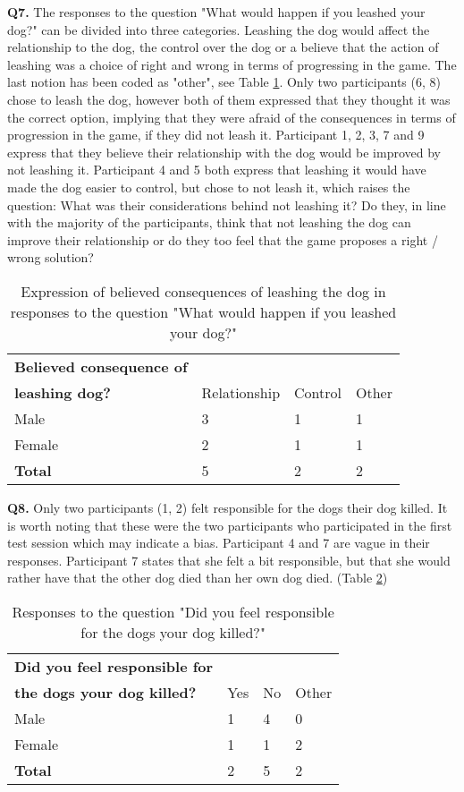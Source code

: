 \textbf{Q7.} The responses to the question "What would happen if you leashed your dog?" can be divided into three categories. Leashing the dog would affect the relationship to the dog, the control over the dog or a believe that the action of leashing was a choice of right and wrong in terms of progressing in the game. The last notion has been coded as "other", see Table \ref{tab:leash}. Only two participants (6, 8) chose to leash the dog, however both of them expressed that they thought it was the correct option, implying that they were afraid of the consequences in terms of progression in the game, if they did not leash it. Participant 1, 2, 3, 7 and 9 express that they believe their relationship with the dog would be improved by not leashing it. Participant 4 and 5 both express that leashing it would have made the dog easier to control, but chose to not leash it, which raises the question: What was their considerations behind not leashing it? Do they, in line with the majority of the participants, think that not leashing the dog can improve their relationship or do they too feel that the game proposes a right / wrong solution?

\begin{table}[h]
\centering
\begin{tabular}{l l l l}
\hline
\textbf{Believed consequence of}\\
\textbf{leashing dog?} & Relationship & Control & Other \\
\hline
Male & 3 & 1 & 1 \\
Female & 2 & 1 & 1 \\
\textbf{Total} & 5 & 2 & 2 \\
\hline
\end{tabular}
\caption{\label{tab:leash}Expression of believed consequences of leashing the dog in responses to the question "What would happen if you leashed your dog?"}
\end{table}


\textbf{Q8.} Only two participants (1, 2) felt responsible for the dogs their dog killed. It is worth noting that these were the two participants who participated in the first test session which may indicate a bias. Participant 4 and 7 are vague in their responses. Participant 7 states that she felt a bit responsible, but that she would rather have that the other dog died than her own dog died. (Table \ref{tab:resp})

\begin{table}[h]
\centering
\begin{tabular}{l l l l}
\hline
\textbf{Did you feel responsible for}\\
\textbf{the dogs your dog killed?} & Yes & No & Other \\
\hline
Male & 1 & 4 & 0 \\
Female & 1 & 1 & 2 \\
\textbf{Total} & 2 & 5 & 2 \\
\hline
\end{tabular}
\caption{\label{tab:resp}Responses to the question "Did you feel responsible for the dogs your dog killed?"}
\end{table}



